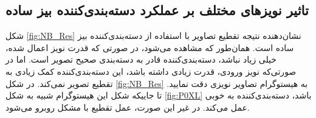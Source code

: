 \documentclass[11.5pt,a4paper]{article}
\begin{document}
\subsection{تاثیر نویزهای مختلف بر عملکرد دسته‌بندی‌کننده بیز ساده}


شکل
\ref{fig:NB_Res}
نشان‌دهنده نتیجه تقطیع تصاویر با استفاده از دسته‌بندی‌کننده بیز ساده است.
همان‌طور که مشاهده می‌شود، در صورتی که قدرت نویز اعمال شده، خیلی زیاد نباشد، دسته‌بندی‌کننده قادر به دسته‌بندی صحیح تصویر است. اما در صورتی‌که نویز ورودی، قدرت زیادی داشته باشد، این دسته‌بندی‌کننده کمک زیادی به تقطیع تصویر نمی‌کند. در شکل
\ref{fig:NB_Res}
به هیستوگرام تصاویر نویزی دقت نمایید. تا جاییکه شکل این هیستوگرام شبیه به شکل 
\ref{fig:P0XL}
باشد، دسته‌بندی‌کننده به خوبی عمل می‌کند. در غیر این صورت، عمل تقطیع با مشکل روبرو می‌شود.
\end{document}
